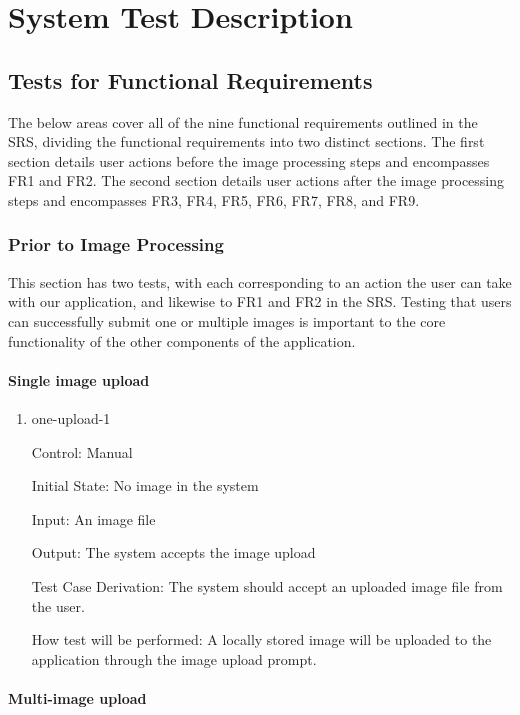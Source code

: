 \documentclass[12pt, titlepage]{article}
\begin{document}
	\section{System Test Description}
	
	\subsection{Tests for Functional Requirements}
	The below areas cover all of the nine functional requirements outlined in the SRS, dividing the functional requirements into two distinct sections. The first section details user actions before the image processing steps and encompasses FR1 and FR2. The second section details user actions after the image processing steps and encompasses FR3, FR4, FR5, FR6, FR7, FR8, and FR9.
	
	\subsubsection{Prior to Image Processing}
	This section has two tests, with each corresponding to an action the user can take with our application, and likewise to FR1 and FR2 in the SRS. Testing that users can successfully submit one or multiple images is important to the core functionality of the other components of the application.
	
	\paragraph{Single image upload}
	
	\begin{enumerate}
		
		\item{one-upload-1\\}
		
		Control: Manual
		
		Initial State: No image in the system
		
		Input: An image file
		
		Output: The system accepts the image upload
		
		Test Case Derivation: The system should accept an uploaded image file from the user.
		
		How test will be performed: A locally stored image will be uploaded to the application through the image upload prompt. 
		
	\end{enumerate}
	
	\paragraph{Multi-image upload}
	
\end{document}
